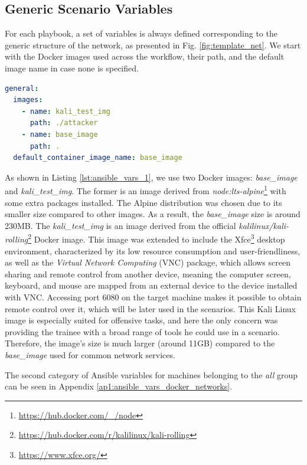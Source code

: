 \subsection{Generic Scenario Variables} \label{sec:generic_scenario_variables}

For each playbook, a set of variables is always defined corresponding to the generic structure of the network, as presented in Fig. \ref{fig:template_net}. We start with the Docker images used across the workflow, their path, and the default image name in case none is specified.

\begin{lstlisting}[language=yaml,caption=Ansible Variables - Docker Images.,numbers=none,label={lst:ansible_vars_1}]
general:
  images:
    - name: kali_test_img
      path: ./attacker
    - name: base_image
      path: .
  default_container_image_name: base_image
\end{lstlisting}

As shown in Listing \ref{lst:ansible_vars_1}, we use two Docker images: \textit{base\_image} and \textit{kali\_test\_img}. The former is an image derived from \textit{node:lts-alpine}\footnote{\url{https://hub.docker.com/_/node}} with some extra packages installed. The Alpine distribution was chosen due to its smaller size compared to other images. As a result, the \textit{base\_image} size is around 230MB. The \textit{kali\_test\_img} is an image derived from the official \textit{kalilinux/kali-rolling}\footnote{\url{https://hub.docker.com/r/kalilinux/kali-rolling}} Docker image. This image was extended to include the Xfce\footnote{\url{https://www.xfce.org/}} desktop environment, characterized by its low resource consumption and user-friendliness, as well as the \textit{Virtual Network Computing} (VNC) package, which allows screen sharing and remote control from another device, meaning the computer screen, keyboard, and mouse are mapped from an external device to the device installed with VNC. Accessing port 6080 on the target machine makes it possible to obtain remote control over it, which will be later used in the scenarios. This Kali Linux image is especially suited for offensive tasks, and here the only concern was providing the trainee with a broad range of tools he could use in a scenario. Therefore, the image's size is much larger (around 11GB) compared to the \textit{base\_image} used for common network services.

The second category of Ansible variables for machines belonging to the \textit{all} group can be seen in Appendix \ref{ap1:ansible_vars_docker_networks}.

